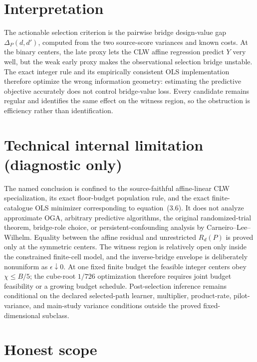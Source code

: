 \documentclass{article}
\begin{document}
\section{Interpretation}

The actionable selection criterion is the pairwise bridge design-value gap \(\Delta_P(d,d')\), computed from the two source-score variances and known costs.  At the binary centers, the late proxy lets the CLW affine regression predict \(Y\) very well, but the weak early proxy makes the observational selection bridge unstable.  The exact integer rule and its empirically consistent OLS implementation therefore optimize the wrong information geometry: estimating the predictive objective accurately does not control bridge-value loss.  Every candidate remains regular and identifies the same effect on the witness region, so the obstruction is efficiency rather than identification.

\section*{Technical internal limitation (diagnostic only)}

The named conclusion is confined to the source-faithful affine-linear CLW specialization, its exact floor-budget population rule, and the exact finite-catalogue OLS minimizer corresponding to equation~(3.6).  It does not analyze approximate OGA, arbitrary predictive algorithms, the original randomized-trial theorem, bridge-role choice, or persistent-confounding analysis by Carneiro--Lee--Wilhelm.  Equality between the affine residual and unrestricted \(R_d(P)\) is proved only at the symmetric centers.  The witness region is relatively open only inside the constrained finite-cell model, and the inverse-bridge envelope is deliberately nonuniform as \(\epsilon\downarrow0\).  At one fixed finite budget the feasible integer centers obey \(\chi\le B/5\); the cube-root \(1/726\) optimization therefore requires joint budget feasibility or a growing budget schedule.  Post-selection inference remains conditional on the declared selected-path learner, multiplier, product-rate, pilot-variance, and main-study variance conditions outside the proved fixed-dimensional subclass.

\section{Honest scope}
\end{document}
